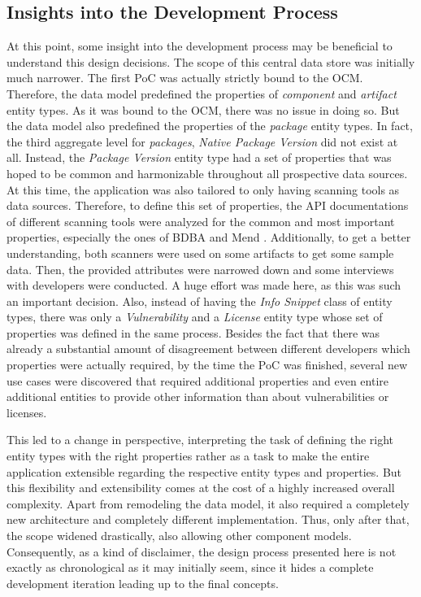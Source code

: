 \subsection{Insights into the Development Process}
At this point, some insight into the development process may be beneficial to understand this design decisions. The scope of this central data store was initially much narrower. The first PoC was actually strictly bound to the OCM. Therefore, the data model predefined the properties of \emph{component} and \emph{artifact} entity types. As it was bound to the OCM, there was no issue in doing so. But the data model also predefined the properties of the \emph{package} entity types. In fact, the third aggregate level for \emph{packages}, \emph{Native Package Version} did not exist at all. Instead, the \emph{Package Version} entity type had a set of properties that was hoped to be common and harmonizable throughout all prospective data sources. At this time, the application was also tailored to only having scanning tools as data sources. Therefore, to define this set of properties, the API documentations of different scanning tools were analyzed for the common and most important properties, especially the ones of BDBA and Mend \cite{MendAPI}. Additionally, to get a better understanding, both scanners were used on some artifacts to get some sample data. Then, the provided attributes were narrowed down and some interviews with developers were conducted. A huge effort was made here, as this was such an important decision. Also, instead of having the \emph{Info Snippet} class of entity types, there was only a \emph{Vulnerability} and a \emph{License} entity type whose set of properties was defined in the same process. Besides the fact that there was already a substantial amount of disagreement between different developers which properties were actually required, by the time the PoC was finished, several new use cases were discovered that required additional properties and even entire additional entities to provide other information than about vulnerabilities or licenses.\par
This led to a change in perspective, interpreting the task of defining the right entity types with the right properties rather as a task to make the entire application extensible regarding the respective entity types and properties. But this flexibility and extensibility comes at the cost of a highly increased overall complexity. Apart from remodeling the data model, it also required a completely new architecture and completely different implementation. Thus, only after that, the scope widened drastically, also allowing other component models. Consequently, as a kind of disclaimer, the design process presented here is not exactly as chronological as it may initially seem, since it hides a complete development iteration leading up to the final concepts.

